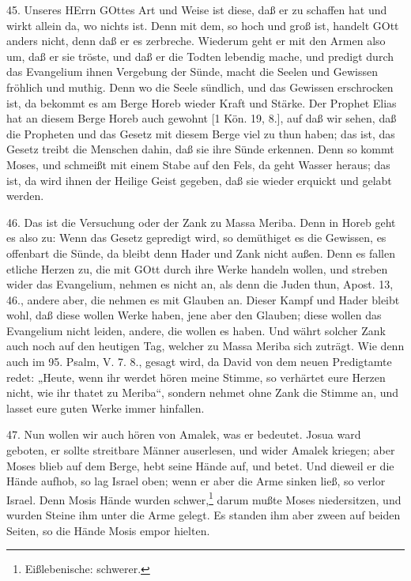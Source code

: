 45. Unseres HErrn GOttes Art und Weise ist diese, daß er zu schaffen hat und wirkt allein da, wo nichts ist. Denn mit dem, so hoch und groß ist, handelt GOtt anders nicht, denn daß er es zerbreche. Wiederum geht er mit den Armen also um, daß er sie tröste, und daß er die Todten lebendig mache, und predigt durch das Evangelium ihnen Vergebung der Sünde, macht die Seelen und Gewissen fröhlich und muthig. Denn wo die Seele sündlich, und das Gewissen erschrocken ist, da bekommt es am Berge Horeb wieder Kraft und Stärke. Der Prophet Elias hat an diesem Berge Horeb auch gewohnt [1 Kön. 19, 8.], auf daß wir sehen, daß die Propheten und das Gesetz mit diesem Berge viel zu thun haben; das ist, das Gesetz treibt die Menschen dahin, daß sie ihre Sünde erkennen. Denn so kommt Moses, und schmeißt mit einem Stabe auf den Fels, da geht Wasser heraus; das ist, da wird ihnen der Heilige Geist gegeben, daß sie wieder erquickt und gelabt werden.

46. Das ist die Versuchung oder der Zank zu Massa Meriba. Denn in Horeb geht es also zu: Wenn das Gesetz gepredigt wird, so demüthiget es die Gewissen, es offenbart die Sünde, da bleibt denn Hader und Zank nicht außen. Denn es fallen etliche Herzen zu, die mit GOtt durch ihre Werke handeln wollen, und streben wider das Evangelium, nehmen es nicht an, als denn die Juden thun, Apost. 13, 46., andere aber, die nehmen es mit Glauben an. Dieser Kampf und Hader bleibt wohl, daß diese wollen Werke haben, jene aber den Glauben; diese wollen das Evangelium nicht leiden, andere, die wollen es haben. Und währt solcher Zank auch noch auf den heutigen Tag, welcher zu Massa Meriba sich zuträgt. Wie denn auch im 95. Psalm, V. 7. 8., gesagt wird, da David von dem neuen Predigtamte redet: „Heute, wenn ihr werdet hören meine Stimme, so verhärtet eure Herzen nicht, wie ihr thatet zu Meriba“, sondern nehmet ohne Zank die Stimme an, und lasset eure guten Werke immer hinfallen.

47. Nun wollen wir auch hören von Amalek, was er bedeutet. Josua ward geboten, er sollte streitbare Männer auserlesen, und wider Amalek kriegen; aber Moses blieb auf dem Berge, hebt seine Hände auf, und betet. Und dieweil er die Hände aufhob, so lag Israel oben; wenn er aber die Arme sinken ließ, so verlor Israel. Denn Mosis Hände wurden schwer,\footnote{Eißlebenische: schwerer.} darum mußte Moses niedersitzen, und wurden Steine ihm unter die Arme gelegt. Es standen ihm aber zween auf beiden Seiten, so die Hände Mosis empor hielten.

